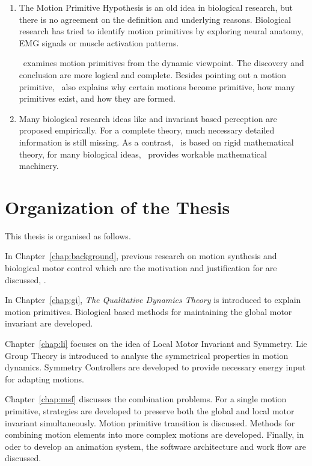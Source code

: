 \begin{enumerate}
\item 
The Motion Primitive Hypothesis is an old idea in biological research, but there is no agreement on the definition and underlying reasons.
Biological research has tried to identify motion primitives by exploring neural anatomy, EMG signals or muscle activation patterns.

{\moit}\ examines motion primitives from the dynamic viewpoint.
The discovery and conclusion are more logical and complete.
Besides pointing out a motion primitive, {\moit}\ also explains why certain motions become primitive, how many primitives exist, and how they are formed.


\item Many biological research ideas like \cpg and invariant based perception are proposed empirically. 
For a complete theory, much necessary detailed information is still missing.
As a contrast, {\moit}\ is based on rigid mathematical theory, for many biological ideas, {\moit}\ provides workable mathematical machinery.

\end{enumerate}







\section{Organization of the Thesis}

This thesis is organised as follows.
 
In Chapter~\ref{chap:background}, previous research on motion synthesis and biological motor control which are the motivation and justification for {\moit} are discussed, .
 
In Chapter~\ref{chap:gi},  \emph{The Qualitative Dynamics Theory} is introduced to explain motion primitives. 
Biological based  methods for maintaining the global motor invariant are developed.

Chapter~\ref{chap:li} focuses on the idea of Local Motor Invariant and Symmetry.
Lie Group Theory is  introduced  to analyse the symmetrical properties in motion dynamics.
Symmetry Controllers are developed to provide necessary energy input for adapting motions.
 


Chapter~\ref{chap:msf} discusses the combination problems.
For a single motion primitive,  strategies are developed to preserve both the global and local motor invariant simultaneously.
Motion primitive transition is discussed.
Methods for combining motion elements into more complex motions are developed.
Finally, in oder to develop an animation system, the software architecture and work flow are discussed.

